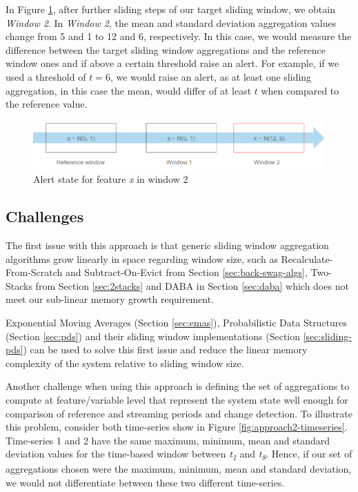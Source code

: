 In Figure \ref{fig:approach2-alert-state}, after further sliding steps of our target sliding window, we obtain \textit{Window 2}. In \textit{Window 2}, the mean and standard deviation aggregation values change from 5 and 1 to 12 and 6, respectively. In this case, we would measure the difference between the target sliding window aggregations and the reference window ones and if above a certain threshold raise an alert. For example, if we used a threshold of $t = 6$, we would raise an alert, as at least one sliding aggregation, in this case the mean, would differ of at least $t$ when compared to the reference value.

\begin{figure}[!htb]
    \begin{center}
      \includegraphics[scale=0.65]{figures/approach2-alert.png}
      \caption[]{Alert state for feature \textit{x} in window 2}
      \label{fig:approach2-alert-state}
    \end{center}
\end{figure}

\subsection*{Challenges}
The first issue with this approach is that generic sliding window aggregation algorithms grow linearly in space regarding window size, such as Recalculate-From-Scratch and Subtract-On-Evict from Section \ref{sec:back-swag-algs}, Two-Stacks from Section \ref{sec:2stacks} and DABA in Section \ref{sec:daba} which does not meet our sub-linear memory growth requirement. 

Exponential Moving Averages (Section \ref{sec:emas}), Probabilistic Data Structures (Section \ref{sec:pds}) and their sliding window implementations (Section \ref{sec:sliding-pds}) can be used to solve this first issue and reduce the linear memory complexity of the system relative to sliding window size. 

Another challenge when using this approach is defining the set of aggregations to compute at feature/variable level that represent the system state well enough for comparison of reference and streaming periods and change detection. To illustrate this problem, consider both time-series show in Figure \ref{fig:approach2-timeseries}. Time-series 1 and 2 have the same maximum, minimum, mean and standard deviation values for the time-based window between \textit{t\textsubscript{1}} and \textit{t\textsubscript{8}}. Hence, if our set of aggregations chosen were the maximum, minimum, mean and standard deviation, we would not differentiate between these two different time-series.


